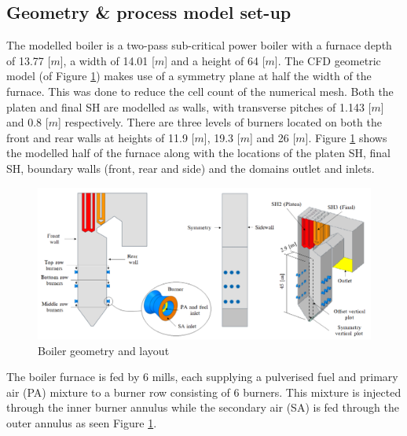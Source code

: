 \documentclass[review]{elsarticle}
\begin{document}
\subsection{Geometry \& process model set-up}
The modelled  boiler is a two-pass sub-critical power boiler with a furnace depth of 13.77 [$m$], a width of 14.01 [$m$] and a height of 64 [$m$]. The CFD geometric model (of Figure \ref{fig_geometry}) makes use of a symmetry plane at half the width of the furnace. This was done to reduce the cell count of the numerical mesh. Both the platen and final SH are modelled as walls, with transverse pitches of 1.143 [$m$] and 0.8 [$m$] respectively. There are three levels of burners located on both the front and rear walls at heights of 11.9 [$m$], 19.3 [$m$] and 26 [$m$]. Figure \ref{fig_geometry} shows the modelled half of the furnace along with the locations of the platen SH, final SH, boundary walls (front, rear and side) and the domains outlet and inlets.\\
\begin{figure} [h!]
\centerline{\includegraphics[scale=0.45]{GEOMETRY}}
\caption{Boiler geometry and layout}
\label{fig_geometry}
\end{figure}

The boiler furnace is fed by 6 mills, each supplying a pulverised fuel and primary air (PA) mixture to a burner row consisting of 6 burners. This mixture is injected through the inner burner annulus while the secondary air (SA) is fed through the outer annulus as seen Figure \ref{fig_geometry}. 
\end{document}
